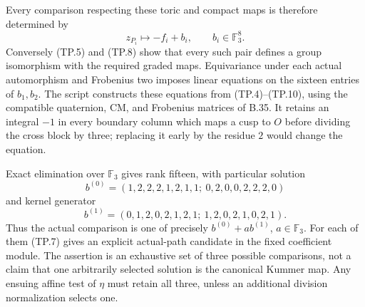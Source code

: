 Every comparison respecting these toric and compact
maps is therefore determined by
\[
                 z_{P_i}\longmapsto-f_i+b_i,
                         \qquad b_i\in\mathbb F_3^8.
                                                               \tag{TP.10}
\]
Conversely (TP.5) and (TP.8) show that every such pair
defines a group isomorphism with the required graded
maps.  Equivariance under each actual automorphism
and Frobenius two imposes linear equations on the
sixteen entries of $b_1,b_2$.
The script constructs these equations from
(TP.4)--(TP.10), using the compatible quaternion,
CM, and Frobenius matrices of B.35.
It retains an integral $-1$ in every boundary column
which maps a cusp to $O$ before dividing the cross
block by three; replacing it early by the residue
$2$ would change the equation.

Exact elimination over $\mathbb F_3$ gives rank fifteen,
with particular solution
\[
 b^{(0)}=(1,2,2,2,1,2,1,1;\ 0,2,0,0,2,2,2,0)
\]
and kernel generator
\[
 b^{(1)}=(0,1,2,0,2,1,2,1;\ 1,2,0,2,1,0,2,1).
                                                               \tag{TP.11}
\]
Thus the actual comparison is one of precisely
$b^{(0)}+a b^{(1)}$, $a\in\mathbb F_3$.
For each of them (TP.7) gives an explicit actual-path
candidate in the fixed coefficient module.
The assertion is an exhaustive set of three possible
comparisons, not a claim that one arbitrarily selected
solution is the canonical Kummer map.
Any ensuing affine test of $\eta$ must retain all three,
unless an additional division normalization selects one.
